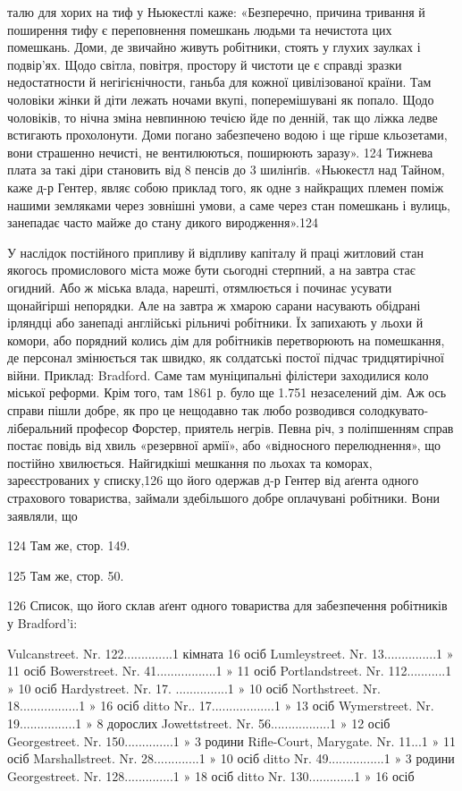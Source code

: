 талю для хорих на тиф у Ньюкестлі каже: «Безперечно, причина
тривання й поширення тифу є переповнення помешкань людьми
та нечистота цих помешкань. Доми, де звичайно живуть робітники,
стоять у глухих заулках і подвір’ях. Щодо світла, повітря,
простору й чистоти це є справді зразки недостатности й негігієнічности,
ганьба для кожної цивілізованої країни. Там чоловіки
жінки й діти лежать ночами вкупі, поперемішувані як попало.
Щодо чоловіків, то нічна зміна невпинною течією йде по
денній, так що ліжка ледве встигають прохолонути. Доми погано
забезпечено водою і ще гірше кльозетами, вони страшенно нечисті,
не вентилюються, поширюють заразу». 124 Тижнева плата
за такі діри становить від 8 пенсів до 3 шилінґів. «Ньюкестл
над Тайном, каже д-р Гентер, являє собою приклад того, як
одне з найкращих племен поміж нашими земляками через зовнішні
умови, а саме через стан помешкань і вулиць, занепадає
часто майже до стану дикого виродження».124

У наслідок постійного припливу й відпливу капіталу й праці
житловий стан якогось промислового міста може бути сьогодні
стерпний, а на завтра стає огидний. Або ж міська влада, нарешті,
отямлюється і починає усувати щонайгірші непорядки. Але на
завтра ж хмарою сарани насувають обідрані ірляндці або занепаді
англійські рільничі робітники. Їх запихають у льохи й
комори, або порядний колись дім для робітників перетворюють
на помешкання, де персонал змінюється так швидко, як солдатські
постої підчас тридцятирічної війни. Приклад: Bradford.
Саме там муніципальні філістери заходилися коло міської реформи.
Крім того, там 1861 р. було ще 1.751 незаселений дім.
Аж ось справи пішли добре, як про це нещодавно так любо
розводився солодкувато-ліберальний професор Форстер, приятель
негрів. Певна річ, з поліпшенням справ постає повідь
від хвиль «резервної армії», або «відносного перелюднення»,
що постійно хвилюється. Найгидкіші мешкання по льохах
та коморах, зареєстрованих у списку,126 що його одержав
д-р Гентер від аґента одного страхового товариства, займали
здебільшого добре оплачувані робітники. Вони заявляли, що

124 Там же, стор. 149.

125 Там же, стор. 50.

126 Список, що його склав аґент одного товариства для забезпечення
робітників у Bradford’i:

Vulcanstreet. Nr. 122..............1 кімната 16 осіб
Lumleystreet. Nr. 13...............1       »        11 осіб
Bowerstreet. Nr. 41.................1        »       11 осіб
Portlandstreet. Nr. 112...........1        »       10 осіб
Hardystreet. Nr. 17. ...............1        »        10 осіб
Northstreet. Nr. 18.................1        »       16 осіб
         ditto Nr.. 17..................1       »       13 осіб
Wymerstreet. Nr. 19................1       »        8 дорослих
Jowettstreet. Nr. 56.................1       »        12 осіб
Georgestreet. Nr. 150..............1       »         3 родини
Rifle-Court, Marygate. Nr. 11...1       »         11 осіб
Marshallstreet. Nr. 28.............1        »         10 осіб
                ditto Nr. 49................1       »         3 родини
Georgestreet. Nr. 128..............1       »         18 осіб
                 ditto Nr. 130.............1       »         16 осіб
